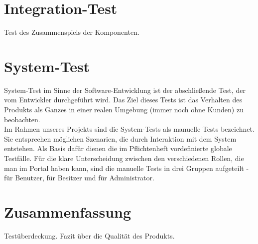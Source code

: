 \documentclass[parskip=full,11pt]{scrartcl}
\begin{document}
\begin{longtable}[c]{|p{0.4cm}|P{2.5cm}|p{3.5cm}|p{5cm}|p{3cm}|}
                  
\end{longtable}
\newpage


\section{Integration-Test} \label{integrationtest}
Test des Zusammenspiels der Komponenten.

\newpage
\section{System-Test} \label{systemtest}
System-Test im Sinne der Software-Entwicklung ist der abschließende Test, der vom Entwickler durchgeführt wird. Das Ziel dieses Tests ist das Verhalten des Produkts als Ganzes in einer realen Umgebung (immer noch ohne Kunden) zu beobachten.\\
Im Rahmen unseres Projekts sind die System-Tests als manuelle Tests bezeichnet. Sie entsprechen möglichen Szenarien, die durch Interaktion mit dem System entstehen. Als Basis dafür dienen die im Pflichtenheft vordefinierte globale Testfälle. Für die klare Unterscheidung zwischen den verschiedenen Rollen, die man im Portal haben kann, sind die manuelle Tests in drei Gruppen aufgeteilt - für Benutzer, für Besitzer und für Administrator.

\newpage
\section{Zusammenfassung} \label{zusammenfassung}
Testüberdeckung. Fazit über die Qualität des Produkts.
\end{document}
